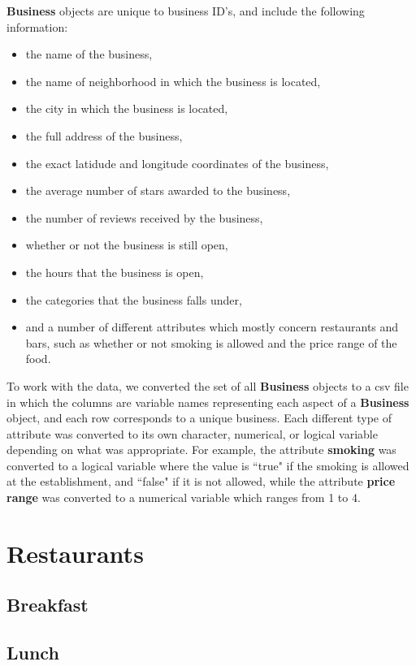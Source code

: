 \documentclass[11pt]{article}
\begin{document}
\textbf{Business} objects are unique to business ID's, and include the following information:
\begin{itemize}
	\item the name of the business,
	\item the name of neighborhood in which the business is located,
	\item the city in which the business is located,
	\item the full address of the business,
	\item the exact latidude and longitude coordinates of the business,
	\item the average number of stars awarded to the business,
	\item the number of reviews received by the business,
	\item whether or not the business is still open,
	\item the hours that the business is open,
	\item the categories that the business falls under,
	\item and a number of different attributes which mostly concern restaurants and bars, such as whether or not smoking is allowed and the price range of the food.
\end{itemize}

To work with the data, we converted the set of all \textbf{Business} objects to a csv file in which the columns are variable names representing each aspect of a \textbf{Business} object, and each row corresponds to a unique business. Each different type of attribute was converted to its own character, numerical, or logical variable depending on what was appropriate. For example, the attribute \textbf{smoking} was converted to a logical variable where the value is ``true" if the smoking is allowed at the establishment, and ``false" if it is not allowed, while the attribute \textbf{price range} was converted to a numerical variable which ranges from 1 to 4.

\section{Restaurants}

\subsection{Breakfast}

\subsection{Lunch}
\end{document}
